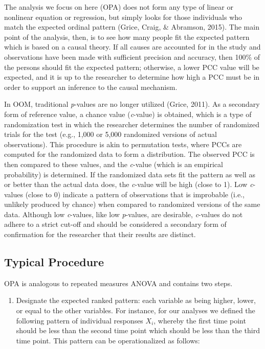 \documentclass[,man, mask]{apa6}
\providecommand{\tightlist}{%
  \setlength{\itemsep}{0pt}\setlength{\parskip}{0pt}}
\theoremstyle{definition}
\theoremstyle{definition}
\theoremstyle{definition}
\theoremstyle{remark}
\begin{document}
The analysis we focus on here (OPA) does not form any type of linear or
nonlinear equation or regression, but simply looks for those individuals
who match the expected ordinal pattern (Grice, Craig, \& Abramson,
2015). The main point of the analysis, then, is to see how many people
fit the expected pattern which is based on a causal theory. If all
causes are accounted for in the study and observations have been made
with sufficient precision and accuracy, then 100\% of the persons should
fit the expected pattern; otherwise, a lower PCC value will be expected,
and it is up to the researcher to determine how high a PCC must be in
order to support an inference to the causal mechanism.

In OOM, traditional \emph{p}-values are no longer utilized (Grice,
2011). As a secondary form of reference value, a chance value
(\emph{c}-value) is obtained, which is a type of randomization test in
which the researcher determines the number of randomized trials for the
test (e.g., 1,000 or 5,000 randomized versions of actual observations).
This procedure is akin to permutation tests, where PCCs are computed for
the randomized data to form a distribution. The observed PCC is then
compared to these values, and the \emph{c}-value (which is an empirical
probability) is determined. If the randomized data sets fit the pattern
as well as or better than the actual data does, the \emph{c}-value will
be high (close to 1). Low \emph{c}-values (close to 0) indicate a
pattern of observations that is improbable (i.e., unlikely produced by
chance) when compared to randomized versions of the same data. Although
low \emph{c}-values, like low \emph{p}-values, are desirable,
\emph{c}-values do not adhere to a strict cut-off and should be
considered a secondary form of confirmation for the researcher that
their results are distinct.

\subsection{Typical Procedure}\label{typical-procedure-2}

OPA is analogous to repeated measures ANOVA and contains two steps.

\begin{enumerate}
\def\labelenumi{\arabic{enumi})}
\tightlist
\item
  Designate the expected ranked pattern: each variable as being higher,
  lower, or equal to the other variables. For instance, for our analyses
  we defined the following pattern of individual responses \(X_i\),
  whereby the first time point should be less than the second time point
  which should be less than the third time point. This pattern can be
  operationalized as follows:
\end{enumerate}
\end{document}
